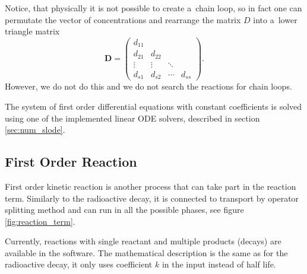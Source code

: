 Notice, that physically it is not possible to create a~chain loop, so in fact one can permutate the vector of 
concentrations and rearrange the matrix $D$ into a~lower triangle matrix
\[
\mathbf{D} = \begin{pmatrix} d_{11} &  &  &  \\ 
                  d_{21} & d_{22} & &  \\
                  \vdots &\vdots& \ddots &  \\
                  d_{s1} &d_{s2}& \cdots & d_{ss} \end{pmatrix}.
\]
However, we do not do this and we do not search the reactions for chain loops.

The system of first order differential equations with constant coefficients is solved using one of the
implemented linear ODE solvers, described in section \ref{sec:num_slode}.


\subsection{First Order Reaction}
\label{sec:first_order_reaction}
First order kinetic reaction is another process that can take part in the reaction term. Similarly to the
radioactive decay, it is connected to transport by operator splitting method and can run in all the possible
phases, see figure \ref{fig:reaction_term}.

Currently, reactions with single reactant and multiple products (decays) are available in the software.
The mathematical description is the same as for the radioactive decay, it only uses 
 coefficient $k$ in the input instead of half life.







